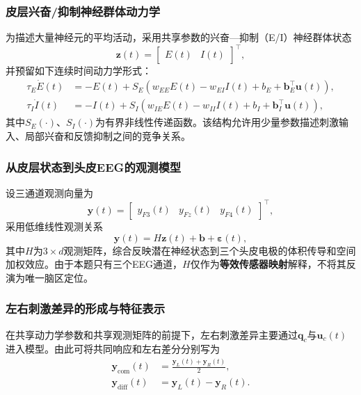 \subsubsection{皮层兴奋/抑制神经群体动力学}

为描述大量神经元的平均活动，采用共享参数的兴奋—抑制（E/I）神经群体状态
\[
\bm z(t)=
\begin{bmatrix}
E(t) & I(t)
\end{bmatrix}^{\top},
\]
并预留如下连续时间动力学形式：
\begin{align}
\tau_E\dot E(t)
&=
-E(t)+S_E\!\left(
w_{EE}E(t)-w_{EI}I(t)+b_E+\bm b_E^\top\bm u(t)
\right),\\
\tau_I\dot I(t)
&=
-I(t)+S_I\!\left(
w_{IE}E(t)-w_{II}I(t)+b_I+\bm b_I^\top\bm u(t)
\right),
\end{align}
其中$S_E(\cdot)$、$S_I(\cdot)$为有界非线性传递函数。该结构允许用少量参数描述刺激输入、局部兴奋和反馈抑制之间的竞争关系。


\subsubsection{从皮层状态到头皮EEG的观测模型}

设三通道观测向量为
\[
\bm y(t)=
\begin{bmatrix}
y_{F3}(t)&y_{Fz}(t)&y_{F4}(t)
\end{bmatrix}^{\top},
\]
采用低维线性观测关系
\begin{equation}
\bm y(t)=H\bm z(t)+\bm b+\bm\varepsilon(t),
\label{eq:q2_observation}
\end{equation}
其中$H$为$3\times d$观测矩阵，综合反映潜在神经状态到三个头皮电极的体积传导和空间加权效应。由于本题只有三个EEG通道，$H$仅作为\textbf{等效传感器映射}解释，不将其反演为唯一脑区定位。

\subsubsection{左右刺激差异的形成与特征表示}

在共享动力学参数和共享观测矩阵的前提下，左右刺激差异主要通过$\bm q_c$与$\bm u_c(t)$进入模型。由此可将共同响应和左右差分分别写为
\begin{align}
\bm y_{\mathrm{com}}(t)
&=\frac{\bm y_{L}(t)+\bm y_{R}(t)}{2},\\
\bm y_{\mathrm{diff}}(t)
&=\bm y_{L}(t)-\bm y_{R}(t).
\end{align}


